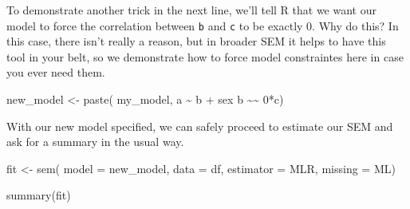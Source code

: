 \documentclass[
]{book}
\newenvironment{Shaded}{\begin{snugshade}}{\end{snugshade}}
\newcommand{\AttributeTok}[1]{\textcolor[rgb]{0.77,0.63,0.00}{#1}}
\newcommand{\FunctionTok}[1]{\textcolor[rgb]{0.00,0.00,0.00}{#1}}
\newcommand{\NormalTok}[1]{#1}
\newcommand{\OtherTok}[1]{\textcolor[rgb]{0.56,0.35,0.01}{#1}}
\newcommand{\StringTok}[1]{\textcolor[rgb]{0.31,0.60,0.02}{#1}}
\begin{document}
To demonstrate another trick in the next line, we'll tell R that we want our model to force the correlation between \texttt{b} and \texttt{c} to be exactly 0. Why do this? In this case, there isn't really a reason, but in broader SEM it helps to have this tool in your belt, so we demonstrate how to force model constraintes here in case you ever need them.

\begin{Shaded}
\begin{Highlighting}[]
\NormalTok{new\_model }\OtherTok{\textless{}{-}} \FunctionTok{paste}\NormalTok{(}
\NormalTok{  my\_model, }
  \StringTok{\textquotesingle{}}
\StringTok{  a \textasciitilde{} b + sex}
\StringTok{  b \textasciitilde{}\textasciitilde{} 0*c\textquotesingle{}}\NormalTok{)}
\end{Highlighting}
\end{Shaded}

With our new model specified, we can safely proceed to estimate our SEM and ask for a summary in the usual way.

\begin{Shaded}
\begin{Highlighting}[]
\NormalTok{fit }\OtherTok{\textless{}{-}} \FunctionTok{sem}\NormalTok{(}
  \AttributeTok{model =}\NormalTok{ new\_model,}
  \AttributeTok{data =}\NormalTok{ df,}
  \AttributeTok{estimator =} \StringTok{\textquotesingle{}MLR\textquotesingle{}}\NormalTok{,}
  \AttributeTok{missing =} \StringTok{\textquotesingle{}ML\textquotesingle{}}\NormalTok{)}

\FunctionTok{summary}\NormalTok{(fit)}
\end{Highlighting}
\end{Shaded}
\end{document}
